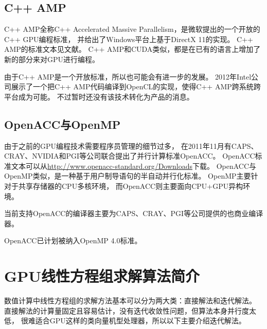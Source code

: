 \subsection{C++ AMP}

C++ AMP全称C++ Accelerated Massive Parallelism，是微软提出的一个开放的C++ GPU编程标准，
并给出了Windows平台上基于DirectX 11的实现。
C++ AMP的标准文本见文献。
C++ AMP和CUDA类似，都是在已有的语言上增加了新的部分来对GPU进行编程。
\cite{cppamp-overview}

由于C++ AMP是一个开放标准，所以也可能会有进一步的发展。
2012年Intel公司展示了一个把C++ AMP代码编译到OpenCL的实现，使得C++ AMP跨系统跨平台成为可能。
\cite{cppamp-opencl}
不过暂时还没有该技术转化为产品的消息。


\subsection{OpenACC与OpenMP}

由于之前的GPU编程技术需要程序员管理的细节过多，
在2011年11月有CAPS、CRAY、NVIDIA和PGI等公司联合提出了并行计算标准OpenACC。
\cite{reyes2012comparative}
OpenACC标准文本可以从\url{http://www.openacc-standard.org/Downloads}下载。
OpenACC与OpenMP类似，是一种基于用户制导语句的半自动并行化标准。
OpenMP主要针对于共享存储器的CPU多核环境，
而OpenACC则主要面向CPU+GPU异构环境。

当前支持OpenACC的编译器主要为CAPS、CRAY、PGI等公司提供的也商业编译器。

OpenACC已计划被纳入OpenMP 4.0标准。\cite{beyer2011openmp}



\section{GPU线性方程组求解算法简介}

数值计算中线性方程组的求解方法基本可以分为两大类：直接解法和迭代解法。
直接解法的计算量固定且容易估计，没有迭代收敛性问题，但算法本身并行度太低，
很难适合GPU这样的类向量机型处理器，所以以下主要介绍迭代解法。

